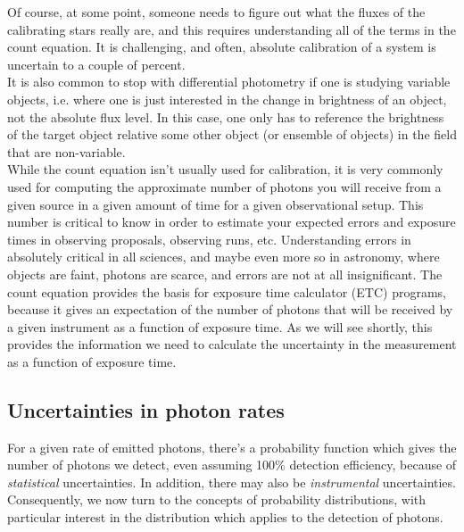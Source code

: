 \documentclass[12pt]{article}
\begin{document}
\noindent Of course, at some point, someone needs to figure out what
the fluxes of the calibrating stars really are, and this requires
understanding all of the terms in the count equation. It is
challenging, and often, absolute calibration of a system is uncertain
to a couple of percent.\\

\noindent It is also common to stop with differential photometry if
one is studying variable objects, i.e. where one is just interested in
the change in brightness of an object, not the absolute flux level. In
this case, one only has to reference the brightness of the target
object relative some other object (or ensemble of objects) in the
field that are non-variable.\\

\noindent While the count equation isn't usually used for calibration,
it is very commonly used for computing the approximate number of
photons you will receive from a given source in a given amount of time
for a given observational setup. This number is critical to know in
order to estimate your expected errors and exposure times in observing
proposals, observing runs, etc. Understanding errors in absolutely
critical in all sciences, and maybe even more so in astronomy, where
objects are faint, photons are scarce, and errors are not at all
insignificant. The count equation provides the basis for exposure time
calculator (ETC) programs, because it gives an expectation of the
number of photons that will be received by a given instrument as a
function of exposure time. As we will see shortly, this provides the
information we need to calculate the uncertainty in the measurement as
a function of exposure time.


\subsection*{Uncertainties in photon rates}
For a given rate of emitted photons, there's a probability function
which gives the number of photons we detect, even assuming 100\%
detection efficiency, because of \emph{statistical} uncertainties. In
addition, there may also be \emph{instrumental} uncertainties. Consequently,
we now turn to the concepts of probability distributions, with
particular interest in the distribution which applies to the detection
of photons.\\
\end{document}
